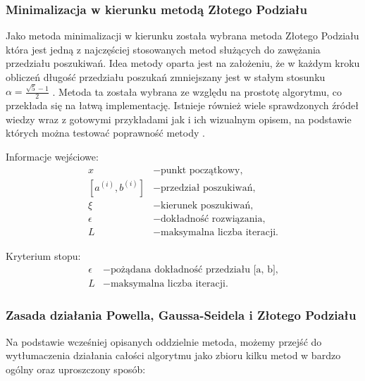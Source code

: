 \documentclass[a4paper,12pt]{article}
\begin{document}
\newpage
\subsubsection{Minimalizacja w kierunku metodą Złotego Podziału}
Jako metoda minimalizacji w kierunku została wybrana metoda Złotego Podziału która jest jedną z najczęściej stosowanych metod służących do zawężania przedziału poszukiwań. Idea metody oparta jest na założeniu, że w każdym kroku obliczeń długość przedziału poszukań zmniejszany jest w stałym stosunku $\alpha = \frac{\sqrt{5} - 1}{2}$ \cite{bibitem2}. Metoda ta została wybrana ze względu na prostotę algorytmu, co przekłada się na łatwą implementację. Istnieje również wiele sprawdzonych źródeł wiedzy wraz z gotowymi przykładami jak i ich wizualnym opisem, na podstawie których można testować poprawność metody \cite{bibitem1}\cite{bibitem2}. \newline

Informacje wejściowe:
\begin{align*}
    x &- \mbox{punkt początkowy,} \\
    [a^{(i)}, b^{(i)}] &- \mbox{przedział poszukiwań,} \\
    \xi &- \mbox{kierunek poszukiwań,} \\
    \epsilon &- \mbox{dokładność rozwiązania,} \\
    L &- \mbox{maksymalna liczba iteracji.}
\end{align*}

Kryterium stopu:
\begin{equation} \label{eq:7}
    \begin{split}
        \epsilon &- \mbox{pożądana dokładność przedziału [a, b],} \\
        L &- \mbox{maksymalna liczba iteracji.}
    \end{split}
\end{equation}

\subsubsection{Zasada działania Powella, Gaussa-Seidela i Złotego Podziału}
Na podstawie wcześniej opisanych oddzielnie metoda, możemy przejść do wytłumaczenia działania całości algorytmu jako zbioru kilku metod w bardzo ogólny oraz uproszczony sposób:
\end{document}
